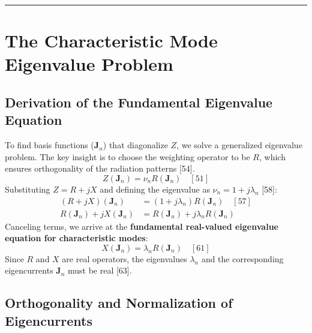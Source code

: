 \documentclass[11pt]{article}
\newcommand{\vect}[1]{\mathbf{#1}}
\theoremstyle{definition}
\begin{document}
\hrule\vspace{1.5em}

\section{The Characteristic Mode Eigenvalue Problem}

\subsection{Derivation of the Fundamental Eigenvalue Equation}
To find basis functions ($\vect{J}_n$) that diagonalize $Z$, we solve a generalized eigenvalue problem. The key insight is to choose the weighting operator to be $R$, which ensures orthogonality of the radiation patterns [54].
\begin{equation}
Z(\vect{J}_n) = \nu_n R(\vect{J}_n) \quad [51]
\end{equation}
Substituting $Z = R+jX$ and defining the eigenvalue as $\nu_n = 1 + j\lambda_n$ [58]:
\begin{align}
(R+jX)(\vect{J}_n) &= (1+j\lambda_n) R(\vect{J}_n) \quad [57] \\
R(\vect{J}_n) + jX(\vect{J}_n) &= R(\vect{J}_n) + j\lambda_n R(\vect{J}_n) \nonumber
\end{align}
Canceling terms, we arrive at the \textbf{fundamental real-valued eigenvalue equation for characteristic modes}:
\begin{equation}
X(\vect{J}_n) = \lambda_n R(\vect{J}_n) \quad [61]
\end{equation}
Since $R$ and $X$ are real operators, the eigenvalues $\lambda_n$ and the corresponding eigencurrents $\vect{J}_n$ must be real [63].

\subsection{Orthogonality and Normalization of Eigencurrents}
\end{document}
